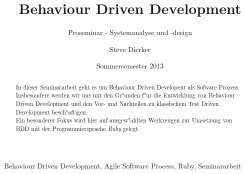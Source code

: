 \documentclass[runningheads,a4paper]{llncs}
\newcommand{\keywords}[1]{\par\addvspace\baselineskip
\noindent\keywordname\enspace\ignorespaces#1}
\begin{document}
\mainmatter

\title{Behaviour Driven Development}
\subtitle{Proseminar - Systemanalyse und -design}
\date{Sommersemester 2013}

\author{Steve Dierker}


\maketitle

\begin{abstract}
  In dieser Seminararbeit geht es um Behaviour Driven Developent als Sofware 
  Prozess. Insbesondere werden wir uns mit den Gr"unden f"ur die Entwicklung von
  Behaviour Driven Development und den Vor- und Nachteilen zu klassischem Test 
  Driven Development besch"aftigen.\\
  Ein besonderer Fokus wird hier auf ausgew"ahlten Werkzeugen zur Umsetzung von 
  BDD mit der Programmiersprache {\em Ruby} gelegt.


\end{abstract}

\keywords{Behaviour Driven Development, Agile Software Process, Ruby, Seminararbeit}
\end{document}
